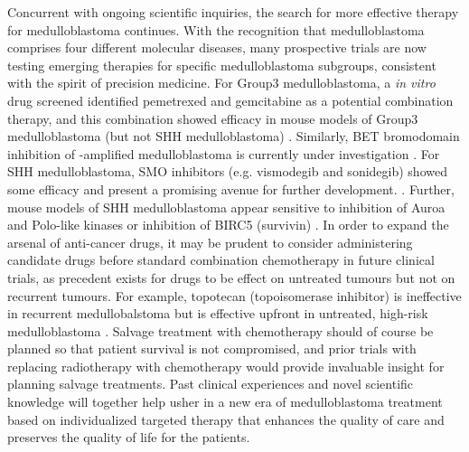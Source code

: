 Concurrent with ongoing scientific inquiries, the search for more effective therapy for medulloblastoma continues. With the recognition that medulloblastoma comprises four different molecular diseases, many prospective trials are now testing emerging therapies for specific medulloblastoma subgroups, consistent with the spirit of precision medicine. For Group3 medulloblastoma, a \emph{in vitro} drug screened identified  pemetrexed and gemcitabine as a potential combination therapy, and this combination showed efficacy in mouse models of Group3 medulloblastoma (but not SHH medulloblastoma) . Similarly, BET bromodomain inhibition of -amplified medulloblastoma is currently under investigation . For SHH medulloblastoma, SMO inhibitors (e.g. vismodegib and sonidegib) showed some efficacy and present a promising avenue for further development. . Further, mouse models of SHH medulloblastoma appear sensitive to inhibition of Auroa and Polo-like kinases  or inhibition of BIRC5 (survivin) . In order to expand the arsenal of anti-cancer drugs, it may be prudent to consider administering candidate drugs before standard combination chemotherapy in future clinical trials, as precedent exists for drugs to be effect on untreated tumours but not on recurrent tumours. For example, topotecan (topoisomerase inhibitor) is ineffective in recurrent medullobalstoma  but is effective upfront in untreated, high-risk medulloblastoma . Salvage treatment with chemotherapy should of course be planned so that patient survival is not compromised, and prior trials with replacing radiotherapy with chemotherapy would provide invaluable insight for planning salvage treatments. Past clinical experiences and novel scientific knowledge will together help usher in a new era of medulloblastoma treatment based on individualized targeted therapy that enhances the quality of care and preserves the quality of life for the patients.


